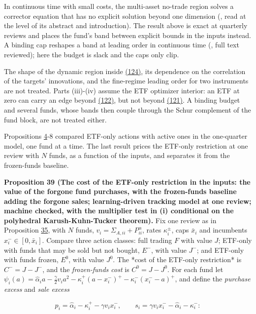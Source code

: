 \documentclass[11pt]{article}
\begin{document}
In continuous time with small costs, the multi-asset no-trade region
solves a corrector equation that has no explicit solution beyond one
dimension (\cite{possamai2015homogenization}, read at the level of its
abstract and introduction). The result above is exact at quarterly
reviews and places the fund's band between explicit bounds in the
inputs instead. A binding cap reshapes a band at leading order in
continuous time (\cite{liu2013portfolio}, full text reviewed); here the
budget is slack and the caps only clip.

The shape of the dynamic region inside \hyperref[eq:124]{(124)}, its dependence on the
correlation of the targets' innovations, and the fine-regime leading
order for two instruments are not treated. Parts (iii)-(iv) assume the
ETF optimizer interior: an ETF at zero can carry an edge beyond \hyperref[eq:122]{(122)},
but not beyond \hyperref[eq:121]{(121)}. A binding budget and several funds, whose bands
then couple through the Schur complement of the fund block, are not
treated either.

Propositions \hyperref[res:Proposition-4]{4}-8 compared ETF-only actions with active ones in the
one-quarter model, one fund at a time. The last result prices the
ETF-only restriction at one review with \(N\) funds, as a function of
the inputs, and separates it from the frozen-funds baseline.

\label{res:Proposition-39}
\textbf{Proposition 39 (The cost of the ETF-only restriction in the inputs: the value of the forgone fund purchases, with the frozen-funds baseline adding the forgone sales; learning-driven tracking model at one review; machine checked, with the multiplier test in (i) conditional on the polyhedral Karush-Kuhn-Tucker theorem).}
Fix one review as in Proposition \hyperref[res:Proposition-35]{35}, with \(N\) funds, \(v_i=\Sigma_{A,ii}+P^\alpha_{ii}\),
rates \(\kappa^\pm_i\), caps \(\bar x_i\) and incumbents \(x^-_i\in[0,\bar x_i]\). Compare three
action classes: full trading \(F\) with value \(J\); ETF-only with funds
that may be sold but not bought, \(E^-\), with value \(J^-\); and ETF-only
with funds frozen, \(E^0\), with value \(J^0\). The *cost of the ETF-only
restriction* is \(C^-=J-J^-\), and the \emph{frozen-funds cost} is \(C^0=J-J^0\). For
each fund let \(\psi_i(a)=\hat\alpha_ia-\frac\gamma2v_ia^2-\kappa^+_i(a-x^-_i)^+-\kappa^-_i(x^-_i-a)^+\), and
define the \emph{purchase excess} and \emph{sale excess}

\begin{equation*}
p_i=\hat\alpha_i-\kappa^+_i-\gamma v_ix^-_i,\qquad s_i=\gamma v_ix^-_i-\hat\alpha_i-\kappa^-_i:\tag{125}\label{eq:125}
\end{equation*}
\end{document}
